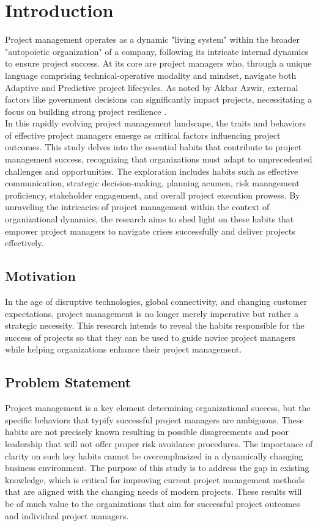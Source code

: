 \documentclass{article}
\begin{document}
\section{Introduction}
Project management operates as a dynamic "living system" within the broader "autopoietic organization" of a company, following its intricate internal dynamics to ensure project success. At its core are project managers who, through a unique language comprising technical-operative modality and mindset, navigate both Adaptive and Predictive project lifecycles. As noted by Akbar Azwir, external factors like government decisions can significantly impact projects, necessitating a focus on building strong project resilience \cite{Lorenzo, Daniele}.\\

In this rapidly evolving project management landscape, the traits and behaviors of effective project managers emerge as critical factors influencing project outcomes. This study delves into the essential habits that contribute to project management success, recognizing that organizations must adapt to unprecedented challenges and opportunities. The exploration includes habits such as effective communication, strategic decision-making, planning acumen, risk management proficiency, stakeholder engagement, and overall project execution prowess. By unraveling the intricacies of project management within the context of organizational dynamics, the research aims to shed light on these habits that empower project managers to navigate crises successfully and deliver projects effectively.

\subsection{Motivation}
In the age of disruptive technologies, global connectivity, and changing customer expectations, project management is no longer merely imperative but rather a strategic necessity. This research intends to reveal the habits responsible for the success of projects so that they can be used to guide novice project managers while helping organizations enhance their project management.

\subsection{Problem Statement}
Project management is a key element determining organizational success, but the specific behaviors that typify successful project managers are ambiguous. These habits are not precisely known resulting in possible disagreements and poor leadership that will not offer proper risk avoidance procedures. The importance of clarity on such key habits cannot be overemphasized in a dynamically changing business environment. The purpose of this study is to address the gap in existing knowledge, which is critical for improving current project management methods that are aligned with the changing needs of modern projects. These results will be of much value to the organizations that aim for successful project outcomes and individual project managers.
\end{document}
